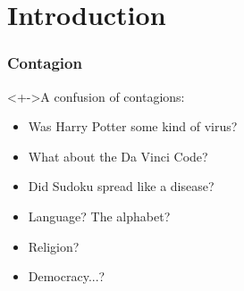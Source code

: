 




%
%




\section{Introduction}

\begin{frame}
  \frametitle{Contagion}

  \begin{block}<+->{A confusion of contagions:}
    \begin{itemize}
    \item<+-> 
      Was Harry Potter some kind of virus?
    \item<+-> 
      What about the Da Vinci Code?
    \item<+-> 
      Did Sudoku spread like a disease?
    \item<+-> 
      Language?  The alphabet?\cite{gleick2011a}
    \item<+-> 
      Religion?
    \item<+-> 
      Democracy...?
    \end{itemize}
  \end{block}


\end{frame}

